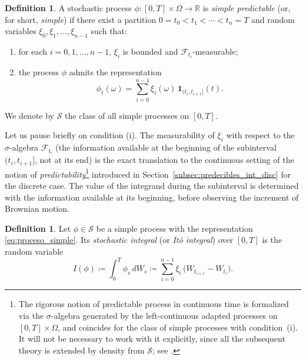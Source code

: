 \documentclass[11pt,a4paper,oneside]{report}
\theoremstyle{plain}
\theoremstyle{definition}
\newtheorem{definicion}[teorema]{Definition}
\theoremstyle{remark}
\newcommand{\R}{\mathbb{R}}
\newcommand{\F}{\mathcal{F}}
\newcommand{\1}{\mathbf{1}}
\newcommand{\eqdef}{\coloneqq}
\begin{document}
\begin{definicion}
\label{def:proceso_simple}
A stochastic process $\phi : [0, T] \times \Omega \to \R$ is
\emph{simple predictable} (or, for short, \emph{simple}) if there
exist a partition $0 = t_0 < t_1 < \cdots < t_n = T$ and random
variables $\xi_0, \xi_1, \ldots, \xi_{n-1}$ such that:
\begin{enumerate}[label=\textnormal{(\roman*)}]
  \item for each $i = 0, 1, \ldots, n-1$, $\xi_i$ is bounded and
        $\F_{t_i}$-measurable;
  \item the process $\phi$ admits the representation
        \begin{equation}\label{eq:proceso_simple}
          \phi_t(\omega) = \sum_{i=0}^{n-1} \xi_i(\omega)\,
                           \mathbf{1}_{(t_i, t_{i+1}]}(t).
        \end{equation}
\end{enumerate}
We denote by $\mathcal{S}$ the class of all simple processes on
$[0, T]$.
\end{definicion}

Let us pause briefly on condition (i). The measurability of $\xi_i$
with respect to the $\sigma$-algebra $\F_{t_i}$ (the information
available at the beginning of the subinterval $(t_i, t_{i+1}]$, not
at its end) is the exact translation to the continuous setting of the
notion of \emph{predictability}\footnote{The rigorous notion of
predictable process in continuous time is formalized via the
$\sigma$-algebra generated by the left-continuous adapted processes
on $[0, T] \times \Omega$, and coincides for the class of simple
processes with condition~(i). It will not be necessary to work with
it explicitly, since all the subsequent theory is extended by density
from $\mathcal{S}$; see \cite{karatzas-shreve}.} introduced in
Section~\ref{subsec:predecibles_int_disc} for the discrete case. The
value of the integrand during the subinterval is determined with the
information available at its beginning, before observing the
increment of Brownian motion.

\medskip

\begin{definicion}
\label{def:integral_simple}
Let $\phi \in \mathcal{S}$ be a simple process with the
representation \eqref{eq:proceso_simple}. Its \emph{stochastic
integral} (or \emph{Itô integral}) over $[0, T]$ is the random
variable
\begin{equation}\label{eq:integral_simple}
  I(\phi) \eqdef \int_0^T \phi_s\, dW_s
            \eqdef \sum_{i=0}^{n-1} \xi_i\,
                   \bigl(W_{t_{i+1}} - W_{t_i}\bigr).
\end{equation}
\end{definicion}
\end{document}
